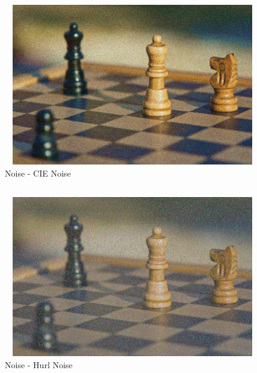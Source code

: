 \documentclass[12pt, a4]{article}
\begin{document}
\subsection*{}
\begin{figure}[h]
\centering
\caption{Noise - CIE Noise}
\includegraphics[height=7cm, width=12cm]{Noise/Chess-CIENoise.jpeg}
\end{figure}

\subsection*{}
\begin{figure}[h]
\centering
\caption{Noise - Hurl Noise}
\includegraphics[height=7cm, width=12cm]{Noise/Chess-HurlNoise.jpeg}
\end{figure}


\newpage
\end{document}
